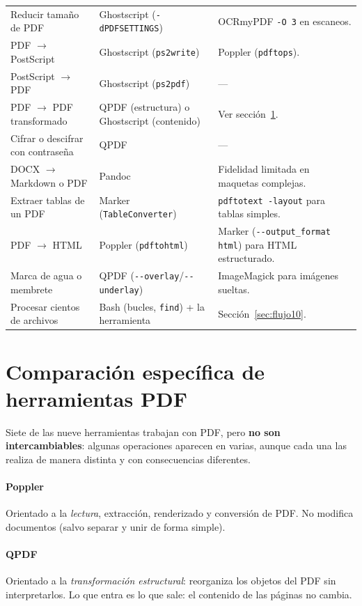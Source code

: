 \documentclass[11pt,a4paper]{article}
\newcommand{\cmd}[1]{\texttt{\textcolor{colcmd}{#1}}}      %
\newcommand{\opt}[1]{\texttt{\textcolor{colopt}{#1}}}      %
\begin{document}
\begin{longtable}{L{4.6cm}L{4.2cm}L{6.26cm}}
		Reducir tamaño de PDF & Ghostscript (\opt{-dPDFSETTINGS}) & OCRmyPDF \opt{-O 3} en escaneos.\\
		PDF $\rightarrow$ PostScript & Ghostscript (\texttt{ps2write}) & Poppler (\cmd{pdftops}).\\
		PostScript $\rightarrow$ PDF & Ghostscript (\cmd{ps2pdf}) & ---\\
		PDF $\rightarrow$ PDF transformado & QPDF (estructura) o Ghostscript (contenido) & Ver sección~\ref{sec:comparacionpdf}.\\
		Cifrar o descifrar con contraseña & QPDF & ---\\
		DOCX $\rightarrow$ Markdown o PDF & Pandoc & Fidelidad limitada en maquetas complejas.\\
		Extraer tablas de un PDF & Marker (\texttt{TableConverter}) & \cmd{pdftotext -layout} para tablas simples.\\
		PDF $\rightarrow$ HTML & Poppler (\cmd{pdftohtml}) & Marker (\opt{-{}-output\_\allowbreak{}format html}) para HTML estructurado.\\
		Marca de agua o membrete & QPDF (\opt{-{}-overlay}/\opt{-{}-underlay}) & ImageMagick para imágenes sueltas.\\*
		Procesar cientos de archivos & Bash (bucles, \cmd{find}) + la herramienta & Sección~\ref{sec:flujo10}.\\
	\end{longtable}
	\endgroup
	
	\clearpage
	\section{Comparación específica de herramientas PDF}\label{sec:comparacionpdf}
	
	Siete de las nueve herramientas trabajan con PDF, pero \textbf{no son intercambiables}: algunas operaciones aparecen en varias, aunque cada una las realiza de manera distinta y con consecuencias diferentes.
	
	\paragraph{Poppler} Orientado a la \emph{lectura}, extracción, renderizado y conversión de PDF. No modifica documentos (salvo separar y unir de forma simple).
	
	\paragraph{QPDF} Orientado a la \emph{transformación estructural}: reorganiza los objetos del PDF sin interpretarlos. Lo que entra es lo que sale: el contenido de las páginas no cambia.
	
\end{document}
